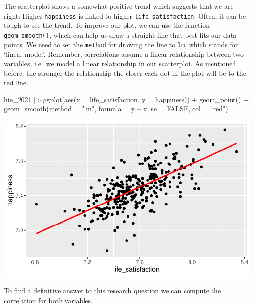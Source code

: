 \documentclass[
  letterpaper,
]{krantz}
\makeatletter
\newenvironment{Shaded}{\begin{snugshade}}{\end{snugshade}}
\newcommand{\AttributeTok}[1]{\textcolor[rgb]{0.40,0.45,0.13}{#1}}
\newcommand{\ConstantTok}[1]{\textcolor[rgb]{0.56,0.35,0.01}{#1}}
\newcommand{\FunctionTok}[1]{\textcolor[rgb]{0.28,0.35,0.67}{#1}}
\newcommand{\NormalTok}[1]{\textcolor[rgb]{0.00,0.23,0.31}{#1}}
\newcommand{\SpecialCharTok}[1]{\textcolor[rgb]{0.37,0.37,0.37}{#1}}
\newcommand{\StringTok}[1]{\textcolor[rgb]{0.13,0.47,0.30}{#1}}
\newenvironment{kframe}{%
\medskip{}
\setlength{\fboxsep}{.8em}
 \def\at@end@of@kframe{}%
 \ifinner\ifhmode%
  \def\at@end@of@kframe{\end{minipage}}%
  \begin{minipage}{\columnwidth}%
 \fi\fi%
 \def\FrameCommand##1{\hskip\@totalleftmargin \hskip-\fboxsep
 \colorbox{shadecolor}{##1}\hskip-\fboxsep
     \hskip-\linewidth \hskip-\@totalleftmargin \hskip\columnwidth}%
 \MakeFramed {\advance\hsize-\width
   \@totalleftmargin\z@ \linewidth\hsize
   \@setminipage}}%
 {\par\unskip\endMakeFramed%
 \at@end@of@kframe}
\renewenvironment{Shaded}{\begin{kframe}}{\end{kframe}}
\makeatother
\begin{document}
The scatterplot shows a somewhat positive trend which suggests that we
are right: Higher \texttt{happiness} is linked to higher
\texttt{life\_satisfaction}. Often, it can be tough to see the trend. To
improve our plot, we can use the function \texttt{geom\_smooth()}, which
can help us draw a straight line that best fits our data points. We need
to set the \texttt{method} for drawing the line to \texttt{lm}, which
stands for `linear model'. Remember, correlations assume a linear
relationship between two variables, i.e.~we model a linear relationship
in our scatterplot. As mentioned before, the stronger the relationship
the closer each dot in the plot will be to the red line.

\begin{Shaded}
\begin{Highlighting}[]
\NormalTok{hie\_2021 }\SpecialCharTok{|\textgreater{}}
  \FunctionTok{ggplot}\NormalTok{(}\FunctionTok{aes}\NormalTok{(}\AttributeTok{x =}\NormalTok{ life\_satisfaction, }\AttributeTok{y =}\NormalTok{ happiness)) }\SpecialCharTok{+}
  \FunctionTok{geom\_point}\NormalTok{() }\SpecialCharTok{+}
  \FunctionTok{geom\_smooth}\NormalTok{(}\AttributeTok{method =} \StringTok{"lm"}\NormalTok{,}
              \AttributeTok{formula =}\NormalTok{ y }\SpecialCharTok{\textasciitilde{}}\NormalTok{ x,}
              \AttributeTok{se =} \ConstantTok{FALSE}\NormalTok{,}
              \AttributeTok{col =} \StringTok{"red"}\NormalTok{)}
\end{Highlighting}
\end{Shaded}

\includegraphics{10_correlations_files/figure-pdf/happiness-vs-life-satisfaction-regression-line-1.pdf}

To find a definitive answer to this research question we can compute the
correlation for both variables.
\end{document}
